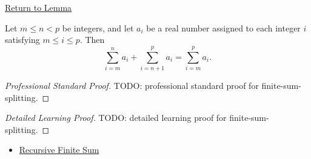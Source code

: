 \newpage
{}
\label{prf:finite-sum-splitting}

\begin{remark*}[Return]
\hyperref[lem:finite-sum-splitting]{Return to Lemma}
\end{remark*}

\begin{lemma*}
Let \(m \le n < p\) be integers, and let \(a_i\) be a real number
assigned to each integer \(i\) satisfying \(m \le i \le p\). Then
\[
  \sum_{i=m}^{n} a_i
  +
  \sum_{i=n+1}^{p} a_i
  =
  \sum_{i=m}^{p} a_i.
\]
\end{lemma*}

\begin{proof}[Professional Standard Proof]
\LRAProofBodyStart
TODO: professional standard proof for finite-sum-splitting.
\end{proof}

\begin{proof}[Detailed Learning Proof]
\LRAProofBodyStart
TODO: detailed learning proof for finite-sum-splitting.
\end{proof}

\begin{remark*}
\end{remark*}

\begin{dependencies}
\begin{itemize}
  \item \hyperref[def:recursive-finite-sum]{Recursive Finite Sum}
\end{itemize}
\end{dependencies}

\clearpage
